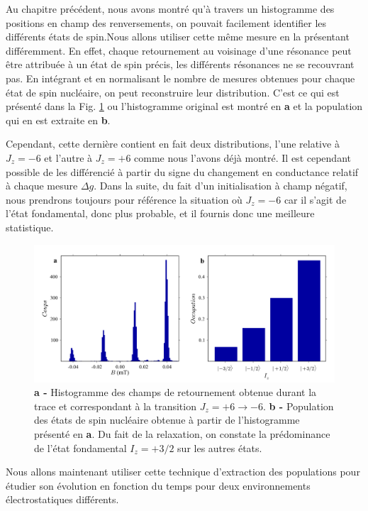 Au chapitre précédent, nous avons montré qu'à travers un histogramme des positions en champ des renversements, on pouvait facilement identifier les différents états de spin.Nous allons utiliser cette m\^eme mesure en la présentant différemment. En effet, chaque retournement au voisinage d'une résonance peut \^etre attribuée à un état de spin précis, les différents résonances ne se recouvrant pas. En intégrant et en normalisant le nombre de mesures obtenues pour chaque état de spin nucléaire, on peut reconstruire leur distribution. C'est ce qui est présenté dans la Fig. \ref{extract_pop} ou l'histogramme original est montré en \textbf{a} et la population qui en est extraite en \textbf{b}.

Cependant, cette dernière contient en fait deux distributions, l'une relative à $J_z=-6$ et l'autre à $J_z=+6$ comme nous l'avons déjà montré. Il est cependant possible de les différencié à partir du signe du changement en conductance relatif à chaque mesure $\Delta g$. Dans la suite, du fait d'un initialisation à champ négatif, nous prendrons toujours pour référence la situation où $J_z=-6$ car il s'agit de l'état fondamental, donc plus probable, et il fournis donc une meilleure statistique.

\begin{figure}
\includegraphics[scale=0.45]{Resultats/Chap2/Figure4/figure4.pdf} 
\caption{\textbf{a -} Histogramme des champs de retournement obtenue durant la trace et correspondant à la transition $J_z = +6 \rightarrow -6$. \textbf{b -} Population des états de spin nucléaire obtenue à partir de l'histogramme présenté en \textbf{a}. Du fait de la relaxation, on constate la prédominance de l'état fondamental $I_z=+3/2$ sur les autres états.}
\label{extract_pop}
\end{figure}

Nous allons maintenant utiliser cette technique d'extraction des populations pour étudier son évolution en fonction du temps pour deux environnements électrostatiques différents.

